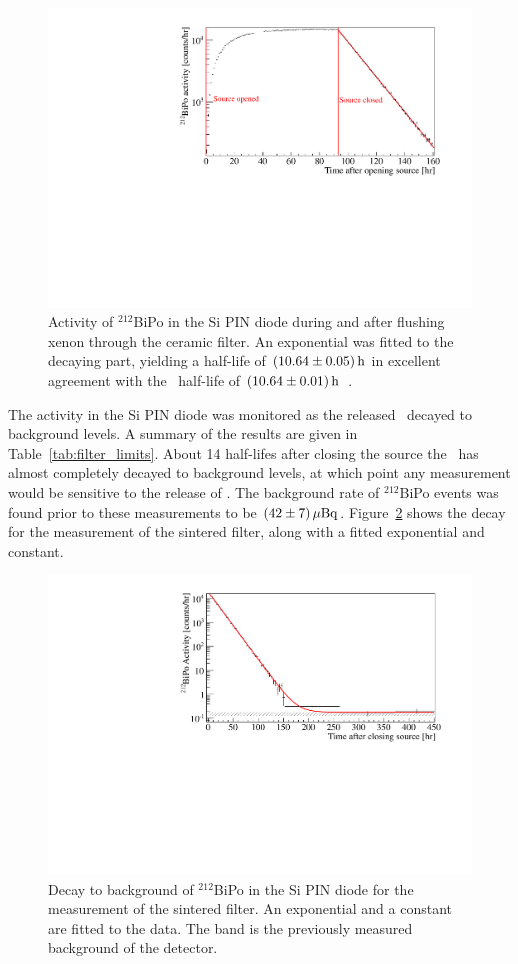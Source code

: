 \begin{figure}[htb]
\centering
\includegraphics[trim = 5 5 40 15, clip = true,width = 0.8\columnwidth]{figures/rnsource/bipo_activity}
\caption{Activity of $^{212}$BiPo in the Si PIN diode during and after flushing xenon through the ceramic filter. An exponential was fitted to the decaying part, yielding a half-life of $(10.64\pm0.05)\, \mathrm{h}$ in excellent agreement with the \Pb~half-life of $(10.64\pm0.01)\, \mathrm{h}$~\cite{Firestone}.}
\label{fig:bipo}
\end{figure}

The activity in the Si PIN diode was monitored as the released \Pb~decayed to background levels. A summary of the results are given in Table~\ref{tab:filter_limits}. About 14 half-lifes after closing the source the \Pb~has almost completely decayed to background levels, at which point any measurement would be sensitive to the release of \Ra. The background rate of $^{212}$BiPo events was found prior to these measurements to be $(42\pm7)\, \mathrm{\mu Bq}$. Figure~\ref{fig:bipo_background} shows the decay for the measurement of the sintered filter, along with a fitted exponential and constant.

\begin{figure}[htb]
\centering
\includegraphics[trim = 10 5 40 15, clip = true,width = 0.8\columnwidth]{figures/rnsource/bipo_background_sintered}
\caption{Decay to background of $^{212}$BiPo in the Si PIN diode for the measurement of the sintered filter. An exponential and a constant are fitted to the data. The band is the previously measured background of the detector.}
\label{fig:bipo_background}
\end{figure}

